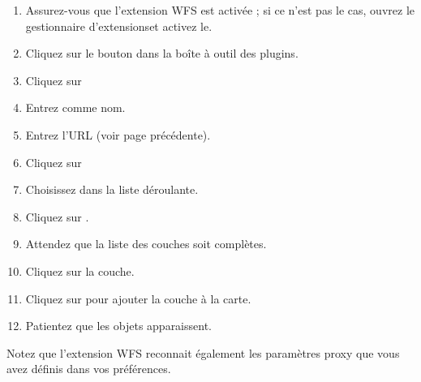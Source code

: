 \begin{enumerate}
  \item Assurez-vous que l'extension WFS est activée ; si ce n'est pas le cas, ouvrez le gestionnaire d'extensionset activez le.
  \item Cliquez sur le bouton  dans la boîte à outil des plugins.
  \item Cliquez sur  
  \item Entrez  comme nom.
\item Entrez l'URL (voir page précédente).
\item Cliquez sur 
  \item Choisissez  dans la liste déroulante.
\item Cliquez sur .
\item Attendez que la liste des couches soit complètes.
\item Cliquez sur la couche.
\item Cliquez sur  pour ajouter la couche à la carte.
\item Patientez que les objets apparaissent.
\end{enumerate}

Notez que l'extension WFS reconnait également les paramètres proxy que vous avez définis dans vos préférences.

